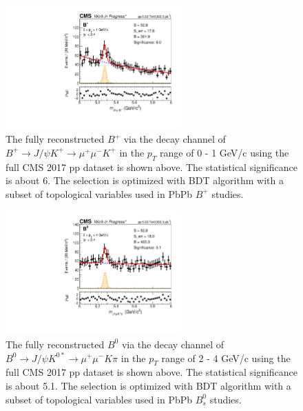 \begin{figure}[hbtp]
\begin{center}
\includegraphics[width=0.60\textwidth]{Figures/Chapter6/BPLow.pdf}
\caption{The fully reconstructed $B^+$ via the decay channel of $B^+\rightarrow J/\psi K^+ \rightarrow \mu^+\mu^- K^+$ in the $p_T$ range of 0 - 1 GeV/c using the full CMS 2017 pp dataset is shown above. The statistical significance is about 6. The selection is optimized with BDT algorithm with a subset of topological variables used in PbPb $B^+$ studies.}
\label{BPLow}
\end{center}
\end{figure}   
 
 \begin{figure}[hbtp]
\begin{center}
\includegraphics[width=0.60\textwidth]{Figures/Chapter6/BZLow.pdf}
\caption{The fully reconstructed $B^0$ via the decay channel of $B^0\rightarrow J/\psi K^{0*} \rightarrow \mu^+\mu^- K \pi$ in the $p_T$ range of 2 - 4 GeV/c using the full CMS 2017 pp dataset is shown above. The statistical significance is about 5.1. The selection is optimized with BDT algorithm with a subset of topological variables used in PbPb $B^0_s$ studies.}
\label{BZLow}
\end{center}
\end{figure}   

